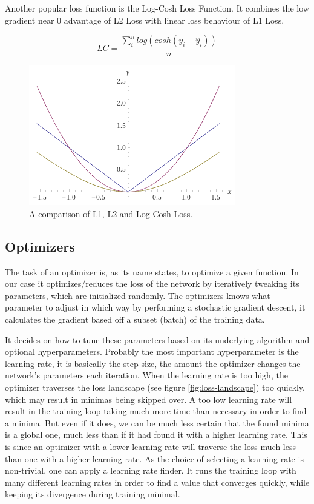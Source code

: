\documentclass[a4paper,10pt]{scrartcl}
\begin{document}
Another popular loss function is the Log-Cosh Loss Function.
It combines the low gradient near 0 advantage of L2 Loss with linear loss behaviour of L1 Loss.

\begin{equation}
    LC = \frac{\sum_i^n log(cosh(y_i - \hat{y}_i))}{n}
\end{equation}


\begin{figure}[h]
    \includegraphics[scale=0.5]{images/l1l2logcoshloss.png}
    \centering
    \caption{A comparison of L1, L2 and Log-Cosh Loss.}
\end{figure}

\subsection{Optimizers}
\label{optimizers}

The task of an optimizer is, as its name states, to optimize a given function.
In our case it optimizes/reduces the loss of the network by iteratively tweaking its parameters, which are initialized randomly.
The optimizers knows what parameter to adjust in which way by performing a stochastic gradient descent, it calculates the gradient based off a subset (batch) of the training data.

It decides on how to tune these parameters based on its underlying algorithm and optional hyperparameters.
Probably the most important hyperparameter is the learning rate, it is basically the step-size, the amount the optimizer changes the network's parameters each iteration.
When the learning rate is too high, the optimizer traverses the loss landscape (see figure \ref{fig:loss-landscape}) too quickly, which may result in minimas being skipped over.
A too low learning rate will result in the training loop taking much more time than necessary in order to find a minima.
But even if it does, we can be much less certain that the found minima is a global one, much less than if it had found it with a higher learning rate.
This is since an optimizer with a lower learning rate will traverse the loss much less than one with a higher learning rate.
As the choice of selecting a learning rate is non-trivial, one can apply a learning rate finder.
It runs the training loop with many different learning rates in order to find a value that converges quickly, while keeping its divergence during training minimal.
\end{document}
